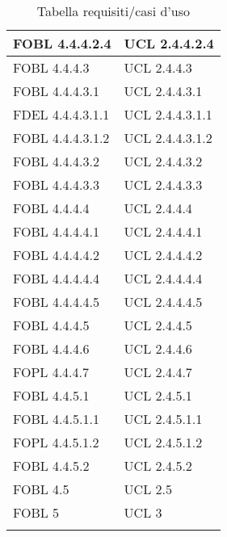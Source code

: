 \begin{longtable}{XX}
\midrule
FOBL 4.4.4.2.4&UCL 2.4.4.2.4\\
\midrule
FOBL 4.4.4.3&UCL 2.4.4.3\\
\midrule
FOBL 4.4.4.3.1&UCL 2.4.4.3.1\\
\midrule
FDEL 4.4.4.3.1.1&UCL 2.4.4.3.1.1\\
\midrule
FOBL 4.4.4.3.1.2&UCL 2.4.4.3.1.2\\
\midrule
FOBL 4.4.4.3.2&UCL 2.4.4.3.2\\
\midrule
FOBL 4.4.4.3.3&UCL 2.4.4.3.3\\
\midrule
FOBL 4.4.4.4&UCL 2.4.4.4\\
\midrule
FOBL 4.4.4.4.1&UCL 2.4.4.4.1\\
\midrule
FOBL 4.4.4.4.2&UCL 2.4.4.4.2\\
\midrule
FOBL 4.4.4.4.4&UCL 2.4.4.4.4\\
\midrule
FOBL 4.4.4.4.5&UCL 2.4.4.4.5\\
\midrule
FOBL 4.4.4.5&UCL 2.4.4.5\\
\midrule
FOBL 4.4.4.6&UCL 2.4.4.6\\
\midrule
FOPL 4.4.4.7&UCL 2.4.4.7\\
\midrule
FOBL 4.4.5.1&UCL 2.4.5.1\\
\midrule
FOBL 4.4.5.1.1&UCL 2.4.5.1.1\\
\midrule
FOPL 4.4.5.1.2&UCL 2.4.5.1.2\\
\midrule
FOBL 4.4.5.2&UCL 2.4.5.2\\
\midrule
FOBL 4.5&UCL 2.5\\
\midrule
FOBL 5&UCL 3\\ 
\bottomrule
\caption{Tabella requisiti/casi d'uso}
\end{longtable}